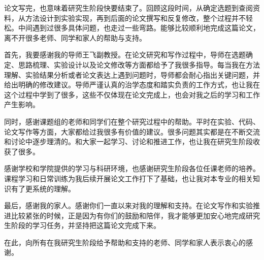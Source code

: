 论文写完，也意味着研究生阶段快要结束了。回顾这段时间，从确定选题到查阅资料，从方法设计到实验实现，再到后面的论文撰写和反复修改，整个过程并不轻松。中间遇到过很多具体问题，也走过一些弯路。能够比较顺利地完成这篇论文，离不开很多老师、同学和家人的帮助与支持。

首先，我要感谢我的导师王飞副教授。在论文研究和写作过程中，导师在选题确定、思路梳理、实验设计以及论文修改等方面都给予了我很多指导。每当我在方法理解、实验结果分析或者论文表达上遇到问题时，导师都会耐心指出关键问题，并给出明确的修改建议。导师严谨认真的治学态度和踏实负责的工作方式，也让我在这个过程中学到了很多，这些不仅体现在论文完成上，也会对我之后的学习和工作产生影响。

同时，感谢课题组的老师和同学们在整个研究过程中的帮助。平时在实验、代码、论文写作等方面，大家都给过我很多有价值的建议。很多问题其实都是在不断交流和讨论中逐步理清的。和大家一起学习、讨论和推进工作，也让我在研究生阶段收获了很多。

感谢学校和学院提供的学习与科研环境，也感谢研究生阶段各位任课老师的培养。课程学习和日常训练为我后续开展论文工作打下了基础，也让我对本专业的相关知识有了更系统的理解。

最后，感谢我的家人。感谢你们一直以来对我的理解和支持。在论文写作和实验推进比较紧张的时候，正是因为有你们的鼓励和陪伴，我才能够更加安心地完成研究生阶段的学习任务，并坚持把这篇论文完成下来。

在此，向所有在我研究生阶段给予帮助和支持的老师、同学和家人表示衷心的感谢。
